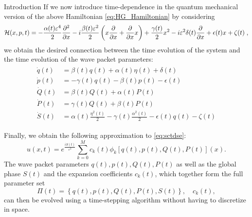 \begin{chapter}{Introduction}
If we now introduce time-dependence in the quantum mechanical version of the above Hamiltonian \eqref{eq:HG_Hamiltonian} by considering
\begin{equation}
    \label{eq:HG_TimeDepHamiltonian}
    \mathcal{H}(x,p,t)	=-\frac{\alpha(t)\varepsilon^4}{2}\frac{\partial ^2}{\partial x}
		        -i\frac{\beta(t)\varepsilon^2}{2}\left(x\frac{\partial }{\partial x}+\frac{\partial }{\partial x}x\right)
			+\frac{\gamma(t)}{2}x^2-i\varepsilon^2\delta(t)\frac{\partial }{\partial x}+\epsilon(t)x+\zeta(t)\;,
\end{equation}
we obtain the desired connection between the time evolution of the system and the time evolution of the wave packet parameters:
\begin{align}
    \begin{split}
	\dot{q}(t)&=\beta(t)q(t)+\alpha(t)\eta(t)+\delta(t)\\
	\dot{p}(t)&=-\gamma(t)q(t)-\beta(t)p(t)-\epsilon(t)\\
	\dot{Q}(t)&=\beta(t)Q(t)+\alpha(t)P(t)\\
	\dot{P}(t)&=\gamma(t)Q(t)+\beta(t)P(t)\\
	\dot{S}(t)&=\alpha(t)\frac{\eta^2(t)}{2}-\gamma(t)\frac{\alpha^2(t)}{2}-\epsilon(t)q(t)-\zeta(t)
    \end{split}
\end{align}


Finally, we obtain the following approximation to \eqref{eq:sctdse}:
\begin{equation}
    \label{eq:HG_approx_soln}
    u(x,t)=e^{\frac{iS(t)}{\varepsilon^2}}\sum_{k=0}^{M} c_k(t)
    \phi_k[q(t),p(t),Q(t),P(t)](x).
\end{equation}
The wave packet parameters $q(t), p(t), Q(t), P(t)$ as well as the global phase $S(t)$ and the
expansion coefficients $c_k(t)$, which together form the full parameter set
\begin{equation}
    \label{eq:parameter_set}
    \Pi(t)=\left\lbrace q(t),p(t),Q(t),P(t),S(t)\right\rbrace,\quad c_k(t),
\end{equation}
can then be evolved using a time-stepping algorithm without having to discretize in space.


\end{chapter}
